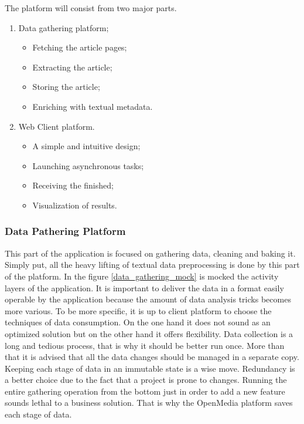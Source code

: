 The platform will consist from two major parts.
\begin{enumerate}
    \item Data gathering platform;
    \begin{itemize}
        \item Fetching the article pages;
        \item Extracting the article;
        \item Storing the article;
        \item Enriching with textual metadata.
    \end{itemize}
    \item Web Client platform.
    \begin{itemize}
        \item A simple and intuitive design;
        \item Launching asynchronous tasks;
        \item Receiving the finished;
        \item Visualization of results.
    \end{itemize}
\end{enumerate}

\subsubsection{Data Pathering Platform}
This part of the application is focused on gathering data, cleaning and baking it. Simply put, all the heavy lifting of textual data preprocessing is done by this part of the platform. In the figure \ref{data_gathering_mock} is mocked the activity layers of the application. It is important to deliver the data in a format easily operable by the application because the amount of data analysis tricks becomes more various. To be more specific, it is up to client platform to choose the techniques of data consumption. On the one hand it does not sound as an optimized solution but on the other hand it offers flexibility. Data collection is a long and tedious process, that is why it should be better run once. More than that it is advised that all the data changes should be managed in a separate copy. Keeping each stage of data in an immutable state is a wise move. Redundancy is a better choice due to the fact that a project is prone to changes. Running the entire gathering operation from the bottom just in order to add a new feature sounds lethal to a business solution. That is why the OpenMedia platform saves each stage of data.

